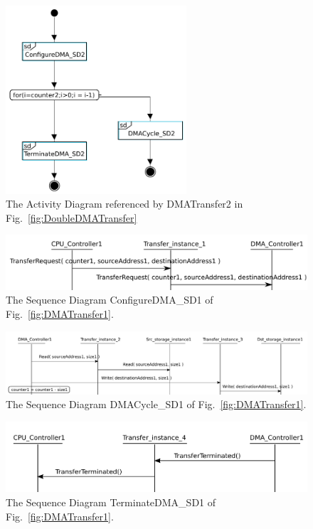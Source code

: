 \documentclass{llncs}
\begin{document}
%
\begin{figure}[!htbp]
	\centering
	\includegraphics[height=7cm]{figures/evaluation/DMATransfer2.pdf}
  \caption{The Activity Diagram referenced by DMATransfer2 in Fig.~\ref{fig:DoubleDMATransfer}}
	\label{fig:DMATransfer2}
\end{figure}
%
\begin{figure}[!htbp]
	\centering
	\includegraphics[width=5in]{figures/evaluation/ConfigureTransfer1.pdf}
	\caption{The Sequence Diagram ConfigureDMA\_SD1 of Fig.~\ref{fig:DMATransfer1}.}
	\label{fig:CP04_1}
\end{figure}
%
\begin{figure}[!htbp]
	\centering
	\includegraphics[width=\textwidth]{figures/evaluation/TransferCycleSD1.pdf}
	\caption{The Sequence Diagram DMACycle\_SD1 of Fig.~\ref{fig:DMATransfer1}.}
	\label{fig:CP04_2}
\end{figure}
%
\begin{figure}[!htbp]
	\centering
	\includegraphics[width=5in]{figures/evaluation/TerminateTransfer1.pdf}
	\caption{The Sequence Diagram TerminateDMA\_SD1 of Fig.~\ref{fig:DMATransfer1}.}
	\label{fig:CP04_3}
\end{figure}
\end{document}
